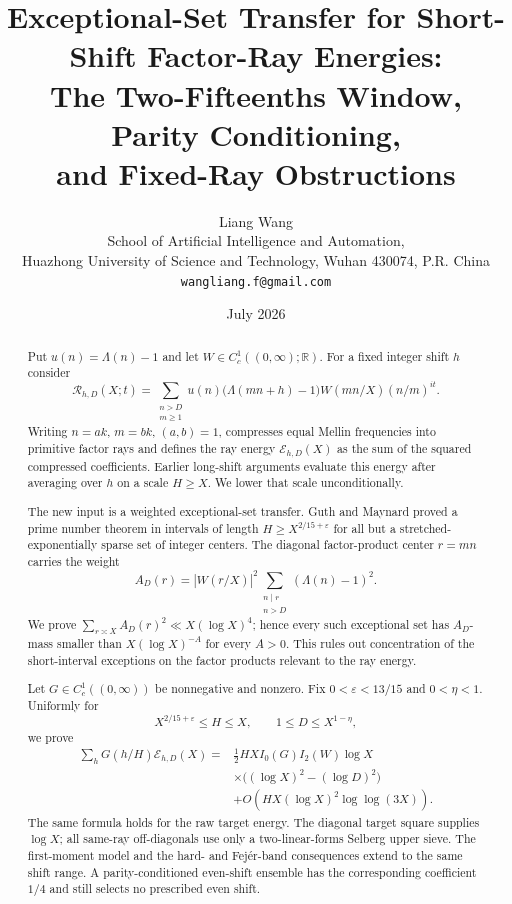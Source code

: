 \documentclass[11pt]{article}
\title{\textbf{Exceptional-Set Transfer for Short-Shift Factor-Ray Energies:}\\
\textbf{The Two-Fifteenths Window, Parity Conditioning,}\\
\textbf{and Fixed-Ray Obstructions}}
\author{Liang Wang\\
\small School of Artificial Intelligence and Automation,\\[-0.2em]
\small Huazhong University of Science and Technology, Wuhan 430074, P.R. China\\
\small \texttt{wangliang.f@gmail.com}}
\date{July 2026}
\theoremstyle{definition}
\theoremstyle{remark}
\newcommand{\R}{\mathbb R}
\newcommand{\eps}{\varepsilon}
\newcommand{\cE}{\mathcal E}
\newcommand{\cR}{\mathcal R}
\begin{document}
\maketitle

\begin{abstract}
Put $u(n)=\Lambda(n)-1$ and let $W\in C_c^1((0,\infty);\R)$.
For a fixed integer shift $h$ consider
\[
 \cR_{h,D}(X;t)=
 \sum_{\substack{n>D\\m\geq1}}
 u(n)\bigl(\Lambda(mn+h)-1\bigr)
 W(mn/X)(n/m)^{it}.
\]
Writing $n=ak$, $m=bk$, $(a,b)=1$, compresses equal Mellin
frequencies into primitive factor rays and defines the ray energy
$\cE_{h,D}(X)$ as the sum of the squared compressed coefficients.
Earlier long-shift arguments evaluate this energy after averaging over
$h$ on a scale $H\geq X$.  We lower that scale unconditionally.

The new input is a weighted exceptional-set transfer.  Guth and Maynard
proved a prime number theorem in intervals of length
$H\geq X^{2/15+\eps}$ for all but a stretched-exponentially sparse set
of integer centers.  The diagonal factor-product center $r=mn$ carries
the weight
\[
 A_D(r)=|W(r/X)|^2
 \sum_{\substack{n\mid r\\n>D}}(\Lambda(n)-1)^2.
\]
We prove $\sum_{r\asymp X}A_D(r)^2\ll X(\log X)^4$; hence every such
exceptional set has $A_D$-mass smaller than $X(\log X)^{-A}$ for every
$A>0$.  This rules out concentration of the short-interval exceptions
on the factor products relevant to the ray energy.

 Let $G\in C_c^1((0,\infty))$ be nonnegative and nonzero.  Fix
 $0<\eps<13/15$ and $0<\eta<1$.  Uniformly for
\[
 X^{2/15+\eps}\leq H\leq X,
 \qquad 1\leq D\leq X^{1-\eta},
\]
we prove
\begin{align*}
 \sum_hG(h/H)\cE_{h,D}(X)
 ={}&\frac12HX I_0(G)I_2(W)\log X\\
 &\times\bigl((\log X)^2-(\log D)^2\bigr)\\
 &+O\!\left(HX(\log X)^2\log\log(3X)\right).
\end{align*}
The same formula holds for the raw target energy.  The diagonal target
square supplies $\log X$; all same-ray off-diagonals use only a
two-linear-forms Selberg upper sieve.  The first-moment model and the
hard- and Fej\'er-band consequences extend to the same shift range.  A
parity-conditioned even-shift ensemble has the corresponding coefficient
$1/4$ and still selects no prescribed even shift.


\end{abstract}
\end{document}
